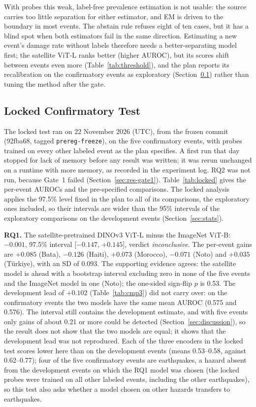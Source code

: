 \documentclass{ieeeaccess}
\begin{document}
With probes this weak, label-free prevalence estimation is not usable: the source carries too little separation for either estimator, and EM is driven to the boundary in most events. The abstain rule refuses eight of ten cases, but it has a blind spot when both estimators fail in the same direction. Estimating a new event's damage rate without labels therefore needs a better-separating model first; the satellite ViT-L ranks better (higher AUROC), but its scores shift between events even more (Table~\ref{tab:threshold}), and the plan reports its recalibration on the confirmatory events as exploratory (Section~\ref{sec:res-locked}) rather than tuning the method after the gate.

\subsection{Locked Confirmatory Test}
\label{sec:res-locked}
The locked test ran on 22 November 2026 (UTC), from the frozen commit (92fba68, tagged \texttt{prereg-freeze}), on the five confirmatory events, with probes trained on every other labeled event as the plan specifies. A first run that day stopped for lack of memory before any result was written; it was rerun unchanged on a runtime with more memory, as recorded in the experiment log. RQ2 was not run, because Gate~1 failed (Section~\ref{sec:res-gate1}). Table~\ref{tab:locked} gives the per-event AUROCs and the pre-specified comparisons. The locked analysis applies the 97.5\% level fixed in the plan to all of its comparisons, the exploratory ones included, so their intervals are wider than the 95\% intervals of the exploratory comparisons on the development events (Section~\ref{sec:stats}).

\textbf{RQ1.} The satellite-pretrained DINOv3 ViT-L minus the ImageNet ViT-B: $-0.001$, 97.5\% interval [$-0.147$, $+0.145$], verdict \emph{inconclusive}. The per-event gains are $+0.085$ (Bata), $-0.126$ (Haiti), $+0.073$ (Morocco), $-0.071$ (Noto) and $+0.035$ (T\"urkiye), with an SD of 0.093. The supporting evidence agrees: the satellite model is ahead with a bootstrap interval excluding zero in none of the five events and the ImageNet model in one (Noto); the one-sided sign-flip $p$ is 0.53. The development lead of $+0.102$ (Table~\ref{tab:cmp3}) did not carry over: on the confirmatory events the two models have the same mean AUROC (0.575 and 0.576). The interval still contains the development estimate, and with five events only gains of about 0.21 or more could be detected (Section~\ref{sec:discussion}), so the result does not show that the two models are equal; it shows that the development lead was not reproduced. Each of the three encoders in the locked test scores lower here than on the development events (means 0.53--0.58, against 0.62--0.77); four of the five confirmatory events are earthquakes, a hazard absent from the development events on which the RQ1 model was chosen (the locked probes were trained on all other labeled events, including the other earthquakes), so this test also asks whether a model chosen on other hazards transfers to earthquakes.
\end{document}
